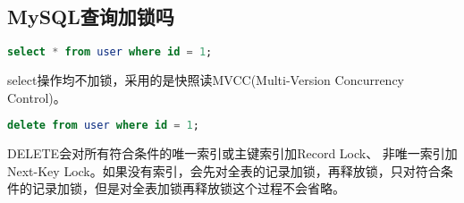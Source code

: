 \documentclass[../../../interview-questions.tex]{subfiles}
\begin{document}
\subsection{MySQL查询加锁吗}

\begin{lstlisting}[language=SQL]
select * from user where id = 1;
\end{lstlisting}

select操作均不加锁，采用的是快照读MVCC(Multi-Version Concurrency Control)。

\begin{lstlisting}[language=SQL]
delete from user where id = 1;
\end{lstlisting}

DELETE会对所有符合条件的唯一索引或主键索引加Record Lock、 非唯一索引加Next-Key Lock。如果没有索引，会先对全表的记录加锁，再释放锁，只对符合条件的记录加锁，但是对全表加锁再释放锁这个过程不会省略。
\end{document}
